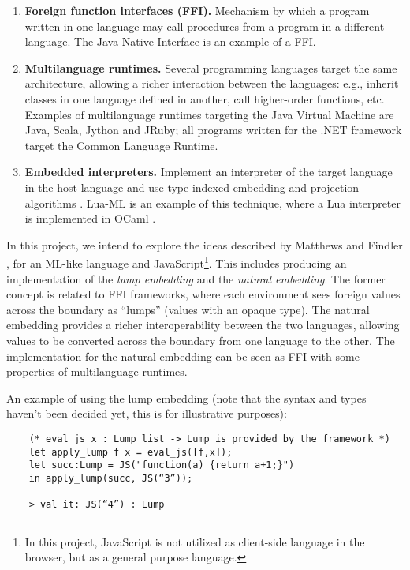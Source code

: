 \documentclass[12pt,a4paper, twoside]{article}
\begin{document}
\begin{enumerate}

\item \textbf{Foreign function interfaces (FFI).} Mechanism by which a
program written in one language may call procedures from a program in
a different language. The Java Native Interface is an example of a FFI.

\item \textbf{Multilanguage runtimes.} Several programming languages
target the same architecture, allowing a richer interaction between
the languages: e.g., inherit classes in one language defined in another,
call higher-order functions, etc. Examples of multilanguage runtimes
targeting the Java Virtual Machine are Java, Scala, Jython and JRuby; all
programs written for the .NET framework target the Common Language Runtime.

\item \textbf{Embedded interpreters.} Implement an interpreter of the
target language in the host language and use type-indexed embedding
and projection algorithms \cite{journals/jfp/Benton05}. Lua-ML is an
example of this technique, where a Lua interpreter is implemented in
OCaml \cite{journals/entcs/Ramsey06}.

\end{enumerate}

In this project, we intend to explore the ideas described by Matthews and Findler
\cite{journals/toplas/MatthewsF09}, for an ML-like language and
JavaScript\footnote{In this project, JavaScript is not utilized as
client-side language in the browser, but as a general purpose
language.}. This includes producing an implementation of the
\emph{lump embedding} and the \emph{natural embedding}. The former
concept is related to FFI frameworks, where each environment sees
foreign values across the boundary as ``lumps'' (values with an opaque
type). The natural embedding provides a richer interoperability
between the two languages, allowing values to be converted across the
boundary from one language to the other. The implementation for the
natural embedding can be seen as FFI with some properties of
multilanguage runtimes.

An example of using the lump embedding (note that the syntax and types
haven't been decided yet, this is for illustrative purposes):

\begin{verbatim}
    (* eval_js x : Lump list -> Lump is provided by the framework *)
    let apply_lump f x = eval_js([f,x]);
    let succ:Lump = JS("function(a) {return a+1;}")
    in apply_lump(succ, JS(“3”));

    > val it: JS(“4”) : Lump
\end{verbatim}
\end{document}
